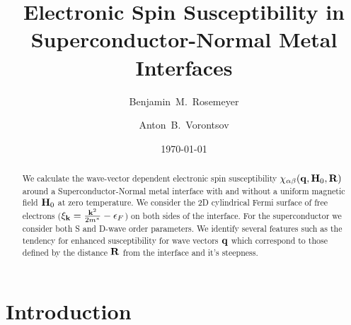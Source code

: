 \documentclass[aps,prl,twocolumn,showpacs,amsmath,amssymb]{revtex4-1}
\begin{document}
\title{Electronic Spin Susceptibility in Superconductor-Normal Metal Interfaces}

\author{Benjamin~M.~Rosemeyer}
\author{Anton~B.~Vorontsov}


\date{\today}

\begin{abstract}
%
We calculate the wave-vector dependent electronic spin susceptibility 
$\chi_{\alpha\beta}({\bf q}, {\bf H}_0, {\bf R})$ 
around a Superconductor-Normal metal interface with and without a uniform magnetic field ${\bf H}_0$ at zero temperature. 
We consider the 2D cylindrical Fermi surface of free electrons ($\xi_{\bf k} = \frac{{\bf k}^2}{2m^*}-\epsilon_F$) on both sides of the interface.
For the superconductor we consider both S and D-wave order parameters.
We identify several features such as the tendency for enhanced susceptibility for wave vectors ${\bf q}$ which correspond to those defined by the distance ${\bf R}$ from the interface and it's steepness.
%
\end{abstract} 


\maketitle


\section*{Introduction}
%

\end{document}
